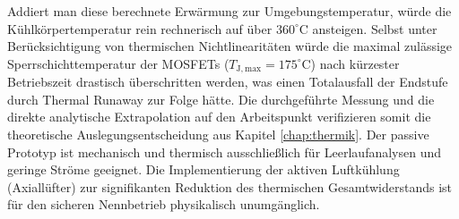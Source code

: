 Addiert man diese berechnete Erwärmung zur Umgebungstemperatur, würde die Kühlkörpertemperatur rein rechnerisch auf über $360^\circ\mathrm{C}$ ansteigen. Selbst unter Berücksichtigung von thermischen Nichtlinearitäten würde die maximal zulässige Sperrschichttemperatur der MOSFETs ($T_{\mathrm{J,max}} = 175^\circ\mathrm{C}$) nach kürzester Betriebszeit drastisch überschritten werden, was einen Totalausfall der Endstufe durch Thermal Runaway zur Folge hätte.
Die durchgeführte Messung und die direkte analytische Extrapolation auf den Arbeitspunkt verifizieren somit die theoretische Auslegungsentscheidung aus Kapitel \ref{chap:thermik}. Der passive Prototyp ist mechanisch und thermisch ausschließlich für Leerlaufanalysen und geringe Ströme geeignet. Die Implementierung der aktiven Luftkühlung (Axiallüfter) zur signifikanten Reduktion des thermischen Gesamtwiderstands ist für den sicheren Nennbetrieb physikalisch unumgänglich.